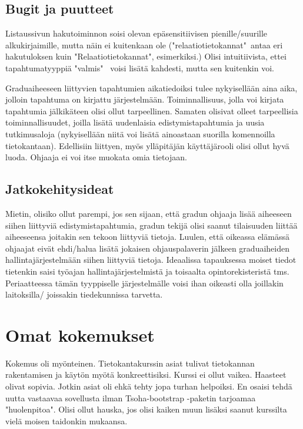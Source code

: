 \documentclass[11pt,a4paper,finnish,oneside]{article}
\begin{document}
\subsection{Bugit ja puutteet}
\begin{par}
Listaussivun hakutoiminnon soisi olevan epäsensitiivisen pienille/suurille alkukirjaimille, mutta näin ei kuitenkaan ole ("relaatiotietokannat"\ antaa eri hakutuloksen kuin "Relaatiotietokannat", esimerkiksi.) Olisi intuitiivista, ettei tapahtumatyyppiä "valmis" \ voisi lisätä kahdesti, mutta sen kuitenkin voi.
\end{par}\vspace{1em}
\begin{par}

Graduaiheeseen liittyvien tapahtumien aikatiedoiksi tulee nykyisellään aina aika, jolloin tapahtuma on kirjattu järjestelmään. Toiminnallisuus, jolla voi kirjata tapahtumia jälkikäteen olisi ollut tarpeellinen. Samaten olisivat olleet tarpeellisia toiminnallisuudet, joilla lisätä uudenlaisia edistymistapahtumia ja uusia tutkimusaloja (nykyisellään niitä voi lisätä ainoastaan suorilla komennoilla tietokantaan). Edellisiin liittyen, myös ylläpitäjän käyttäjärooli olisi ollut hyvä luoda. Ohjaaja ei voi itse muokata omia tietojaan. 
\end{par}

\subsection{Jatkokehitysideat}
\begin{par}
Mietin, olisiko ollut parempi, jos sen sijaan, että gradun ohjaaja lisää aiheeseen siihen liittyviä edistymistapahtumia, gradun tekijä olisi saanut tilaisuuden liittää aiheeseensa joitakin sen tekoon liittyviä tietoja. Luulen, että oikeassa elämässä ohjaajat eivät ehdi/halua lisätä jokaisen ohjauspalaverin jälkeen graduaiheiden hallintajärjestelmään siihen liittyviä tietoja. Ideaalissa tapauksessa moiset tiedot tietenkin saisi työajan hallintajärjestelmistä ja toisaalta opintorekisteristä tms. Periaatteessa tämän tyyppiselle järjestelmälle voisi ihan oikeasti olla joillakin laitoksilla/ joissakin tiedekunnissa tarvetta.
\end{par}

\section{Omat kokemukset}
\begin{par}
Kokemus oli myönteinen. Tietokantakurssin asiat tulivat tietokannan rakentamisen ja käytön myötä konkreettisiksi. Kurssi ei ollut vaikea. Haasteet olivat sopivia. Jotkin asiat oli ehkä tehty jopa turhan helpoiksi. En osaisi tehdä uutta vastaavaa sovellusta ilman Tsoha-bootstrap -paketin tarjoamaa "huolenpitoa". Olisi ollut hauska, jos olisi kaiken muun lisäksi saanut kurssilta vielä moisen taidonkin mukaansa.
\end{par}\vspace{1em}
\end{document}
